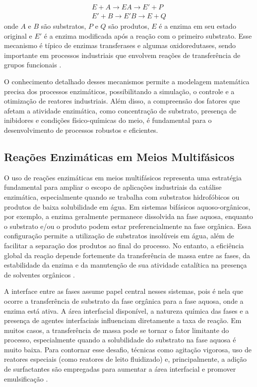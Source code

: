 \documentclass[12pt,oneside]{report}
\begin{document}
\begin{equation}
    \begin{aligned}
        E + A \rightarrow EA \rightarrow E' + P \\
        E' + B \rightarrow E'B \rightarrow E + Q
    \end{aligned}
\end{equation}
onde $A$ e $B$ são substratos, $P$ e $Q$ são produtos, $E$ é a enzima em seu estado original e $E'$ é a enzima modificada após a reação com o primeiro substrato. Esse mecanismo é típico de enzimas transferases e algumas oxidoredutases, sendo importante em processos industriais que envolvem reações de transferência de grupos funcionais \cite{FOGLER_2016}.

O conhecimento detalhado desses mecanismos permite a modelagem matemática precisa dos processos enzimáticos, possibilitando a simulação, o controle e a otimização de reatores industriais. Além disso, a compreensão dos fatores que afetam a atividade enzimática, como concentração de substrato, presença de inibidores e condições físico-químicas do meio, é fundamental para o desenvolvimento de processos robustos e eficientes.

\subsection{Reações Enzimáticas em Meios Multifásicos}

O uso de reações enzimáticas em meios multifásicos representa uma estratégia fundamental para ampliar o escopo de aplicações industriais da catálise enzimática, especialmente quando se trabalha com substratos hidrofóbicos ou produtos de baixa solubilidade em água. Em sistemas bifásicos aquoso-orgânicos, por exemplo, a enzima geralmente permanece dissolvida na fase aquosa, enquanto o substrato e/ou o produto podem estar preferencialmente na fase orgânica. Essa configuração permite a utilização de substratos insolúveis em água, além de facilitar a separação dos produtos ao final do processo. No entanto, a eficiência global da reação depende fortemente da transferência de massa entre as fases, da estabilidade da enzima e da manutenção de sua atividade catalítica na presença de solventes orgânicos \cite{schmid2002enzyme}.

A interface entre as fases assume papel central nesses sistemas, pois é nela que ocorre a transferência de substrato da fase orgânica para a fase aquosa, onde a enzima está ativa. A área interfacial disponível, a natureza química das fases e a presença de agentes interfaciais influenciam diretamente a taxa de reação. Em muitos casos, a transferência de massa pode se tornar o fator limitante do processo, especialmente quando a solubilidade do substrato na fase aquosa é muito baixa. Para contornar esse desafio, técnicas como agitação vigorosa, uso de reatores especiais (como reatores de leito fluidizado) e, principalmente, a adição de surfactantes são empregadas para aumentar a área interfacial e promover emulsificação \cite{schmid2002enzyme}.
\end{document}
